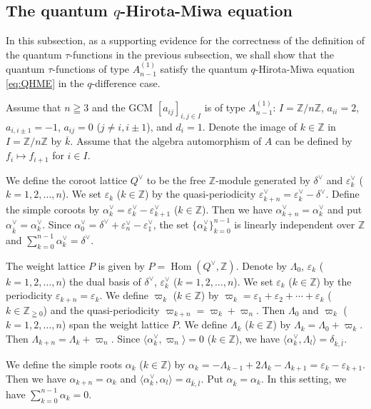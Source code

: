 \documentclass[12pt,twoside]{article}
\newcommand\bra{\langle}
\newcommand\ket{\rangle}
\newcommand\Hom{\mathop{\mathrm{Hom}}\nolimits}
\newcommand\av{\alpha^\vee}
\newcommand\eps{\varepsilon}
\newcommand\epsv{\eps^\vee}
\newcommand\deltav{\delta^\vee}
\newcommand\Qv{Q^\vee}
\newcommand\Z{{\mathbb Z}} %
\theoremstyle{plain} %
\theoremstyle{definition} %
\theoremstyle{definition} %
\numberwithin{theorem}{section}
\numberwithin{equation}{section}
\numberwithin{figure}{section}
\numberwithin{table}{section}
\begin{document}

\subsection{The quantum $q$-Hirota-Miwa equation}
\label{sec:QHME}

In this subsection, as a supporting evidence for the correctness of
the definition of the quantum $\tau$-functions in the previous subsection, 
we shall show that the quantum $\tau$-functions of type $A^{(1)}_{n-1}$ satisfy
the quantum $q$-Hirota-Miwa equation \eqref{eq:QHME} in the $q$-difference case.

Assume that $n\geqq 3$ and the GCM $[a_{ij}]_{i,j\in I}$ is of type $A^{(1)}_{n-1}$:
$I=\Z/n\Z$, $a_{ii}=2$, $a_{i,i\pm1}=-1$, $a_{ij}=0$ ($j\ne i,i\pm1$),
and $d_i=1$.
Denote the image of $k\in\Z$ in $I=\Z/n\Z$ by $\overline{k}$.
Assume that the algebra automorphism of $A$ can be defined by 
$f_i\mapsto f_{i+1}$ for $i\in I$.

We define the coroot lattice $\Qv$ to be the free $\Z$-module generated 
by $\deltav$ and $\epsv_k$ ($k=1,2,\ldots,n$).
We set $\eps_k$ ($k\in\Z$) by the quasi-periodicity $\epsv_{k+n}=\epsv_k-\deltav$.
Define the simple coroots by $\av_k=\epsv_k-\epsv_{k+1}$ ($k\in\Z$). 
Then we have $\av_{k+n}=\av_k$ and put $\av_{\overline{k}}=\av_k$. 
Since $\av_0=\deltav+\epsv_n-\epsv_1$, 
the set $\{\av_k\}_{k=0}^{n-1}$ is linearly independent over $\Z$
and $\sum_{k=0}^{n-1}\av_k=\deltav$.

The weight lattice $P$ is given by $P=\Hom(\Qv,\Z)$.
Denote by $\Lambda_0$, $\eps_k$ ($k=1,2,\ldots,n$)
the dual basis of $\deltav$, $\epsv_k$ ($k=1,2,\dots,n$).
We set $\eps_k$ ($k\in\Z$) by the periodicity $\eps_{k+n}=\eps_k$.
We define $\varpi_k$ ($k\in\Z$) by
$\varpi_k=\eps_1+\eps_2+\cdots+\eps_k$ ($k\in\Z_{\geqq0}$)
and the quasi-periodicity $\varpi_{k+n}=\varpi_k+\varpi_n$.
Then $\Lambda_0$ and $\varpi_k$ ($k=1,2,\ldots,n$) span the weight lattice $P$.
We define $\Lambda_k$ ($k\in\Z$) by
$\Lambda_k=\Lambda_0+\varpi_k$.
Then $\Lambda_{k+n}=\Lambda_k+\varpi_n$.
Since $\bra\av_k,\varpi_n\ket=0$ ($k\in\Z$), 
we have $\bra\av_k,\Lambda_l\ket=\delta_{\overline{k},\overline{l}}$.

We define the simple roots $\alpha_k$ ($k\in\Z$) by \(
 \alpha_k
 =-\Lambda_{k-1}+2\Lambda_k-\Lambda_{k+1}
 = \eps_k-\eps_{k+1}
\). Then we have $\alpha_{k+n}=\alpha_k$
and $\bra\av_k,\alpha_l\ket=a_{\overline{k},\overline{l}}$. 
Put $\alpha_{\overline{k}}=\alpha_k$.
In this setting, we have $\sum_{k=0}^{n-1}\alpha_k=0$.
\end{document}
